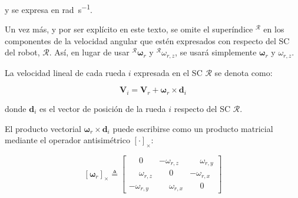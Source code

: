 \documentclass[11pt,a4paper]{article}
\newcommand{\vect}[1]{\bm{#1}}       %
\newcommand{\skewsym}[1]{\left[#1\right]_\times}
\newcommand{\SkewFrom}[3]{%
    \begin{bmatrix}
        \phantom{-}0   & -#3            & \phantom{-}#2  \\
        \phantom{-}#3  & \phantom{-}0   & -#1 \\
        -#2            & \phantom{-}#1  & \phantom{-}0
        \end{bmatrix}
}
\newcommand{\frameR}{\mathcal{R}}
\begin{document}
y se expresa en \si{\radian\per\second}.

Un vez más, y por ser explícito en este texto, se omite el superíndice \({}^\frameR\) en los componentes de la velocidad angular que estén expresados con respecto del SC del robot, \(\frameR\). Así, en lugar de usar \({}^\frameR \vect{\omega}_r\) y \({}^\frameR \omega_{r,z}\), se usará simplemente \(\vect{\omega}_r\) y \(\omega_{r,z}\).

La velocidad lineal de cada rueda \(i\) expresada en el SC \(\frameR\) se denota como:

\begin{equation}
    \vect{V}_{i}  = \vect{V}_r + \vect{\omega}_r \times \vect{d}_{i}
    \label{eq:wheel-velocity}
\end{equation}

donde \(\vect{d}_{i}\) es el vector de posición de la rueda \(i\) respecto del SC \(\frameR\).

El producto vectorial \(\vect{\omega}_r \times \vect{d}_{i}\) puede escribirse como un producto matricial mediante el operador antisimétrico \(\skewsym{\cdot}\):

\begin{equation}
    \skewsym{\vect{\omega}_r} \triangleq
    \SkewFrom{\omega_{r,x}}{\omega_{r,y}}{\omega_{r,z}}
\end{equation}
\end{document}
